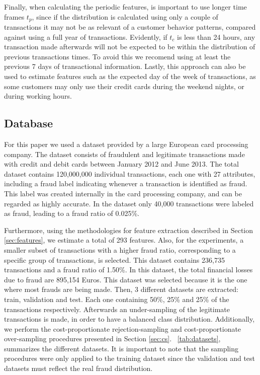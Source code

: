 	Finally, when calculating the periodic features, is important to use longer time frames $t_p$, 
	since if the distribution is calculated using only a couple of transactions it may not be as 
	relevant of a customer behavior patterns, compared against using a full year of transactions.
	Evidently, if $t_c$ is less than 24 hours, any transaction made afterwards will not be expected 
	to be within the distribution of previous transactions times. To avoid this we recomend using at 
	least the previous 7 days of transactional information.
	Lastly, this approach can also be used to estimate features such as the expected day of the week 
	of transactions, as some customers may only use their credit cards during the weekend nights, or 
	during working hours.
	
	\subsection{Database}

 	For this paper we used a dataset provided by a large European card processing company. The 
	dataset consists of fraudulent and legitimate transactions made with credit and debit cards 
	between January 2012 and June 2013. The total dataset contains 120,000,000 individual 
	transactions, each one with 27 attributes, including a fraud label indicating whenever a 
	transaction is identified as fraud. This label was created internally in the card processing 
	company, and can be regarded as highly accurate. In the dataset only 40,000 transactions were 
	labeled as fraud, leading to a fraud ratio of 0.025\%. 

	Furthermore, using the methodologies for feature extraction described in Section 
	\ref{sec:features}, we estimate a total of 293 features. Also,
	for the experiments, a smaller subset of transactions with a higher fraud ratio, corresponding 
	to a specific group of transactions, is selected. This dataset contains 236,735 transactions 
	and a fraud ratio of 1.50\%. In this dataset, the total financial losses due to fraud are 
	895,154 Euros. This dataset was selected because it is the one where most frauds are being 
	made. Then, 3 different datasets are extracted: train, validation and test. Each one containing 
	50\%, 25\% and 25\% of the transactions respectively. Afterwards an under-sampling of the 
	legitimate transactions is made, in order to have a balanced class distribution. 
	Additionally, we perform the cost-proportionate rejection-sampling and cost-proportionate 
	over-sampling procedures presented in Section \ref{sec:cs}.	\mbox{\tablename{ 
	\ref{tab:datasets}}}, summarizes the different datasets.  It is important to note that the 
	sampling procedures were only applied to the training dataset since the validation and test 
	datasets must reflect the real fraud distribution.
	
